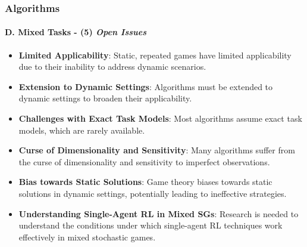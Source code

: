 \documentclass{beamer}
\begin{document}
\begin{frame}
\frametitle{Algorithms}
\framesubtitle{D. Mixed Tasks - (5) \textit{Open Issues}}
\begin{itemize}
    \item \textbf{Limited Applicability}: Static, repeated games have limited applicability due to their inability to address dynamic scenarios.
    \item \textbf{Extension to Dynamic Settings}: Algorithms must be extended to dynamic settings to broaden their applicability.
    \item \textbf{Challenges with Exact Task Models}: Most algorithms assume exact task models, which are rarely available.
    \item \textbf{Curse of Dimensionality and Sensitivity}: Many algorithms suffer from the curse of dimensionality and sensitivity to imperfect observations.
    \item \textbf{Bias towards Static Solutions}: Game theory biases towards static solutions in dynamic settings, potentially leading to ineffective strategies.
    \item \textbf{Understanding Single-Agent RL in Mixed SGs}: Research is needed to understand the conditions under which single-agent RL techniques work effectively in mixed stochastic games.
\end{itemize}
\end{frame}
\end{document}

